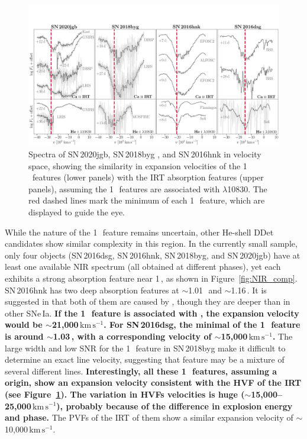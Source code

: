 \documentclass[twocolumn]{aastex631}
\newcommand{\sn}{SN\,2020jgb}
\newcommand{\kms}{$\mathrm{km}\,\mathrm{s}^{-1}$}
\newcommand{\revise}[1]{\textbf{#1}}
\begin{document}
\begin{figure}
    \centering
    \includegraphics[width=\textwidth]{CaII_HeI_hvf.pdf}
    \caption{Spectra of \sn, SN\,2018byg \citep{de_18byg_2019}, and SN\,2016hnk \citep{galbany_16hnk_2019} in velocity space, showing the similarity in expansion velocities of the 1\,\micron\ features (lower panels) with the  IRT absorption features (upper panels), assuming the 1\,\micron\ features are associated with  $\lambda$10830. The red dashed lines mark the minimum of each 1\,\micron\ feature, which are displayed to guide the eye.}
    \label{fig:hvf_comp}
\end{figure}

While the nature of the 1\,\micron\ feature remains uncertain, other He-shell DDet candidates show similar complexity in this region. In the currently small sample, only four objects (SN\,2016dsg, SN\,2016hnk, SN\,2018byg, and \sn) have at least one available NIR spectrum (all obtained at different phases), yet each exhibits a strong absorption feature near 1\,\micron, as shown in Figure~\ref{fig:NIR_comp}. SN\,2016hnk has two deep absorption features at $\sim$1.01\,\micron\ and $\sim$1.16\,\micron. It is suggested in \citet{galbany_16hnk_2019} that both of them are caused by , though they are deeper than in other SNe\,Ia. \revise{If the 1\,\micron\ feature is associated with \ion{He}{1}, the expansion velocity would be $\sim$21,000\,\kms. For SN\,2016dsg, the minimal of the 1\,\micron\ feature is around $\sim$1.03\,\micron, with a corresponding velocity of $\sim$15,000\,\kms.} The large width and low SNR for the 1\,\micron\ feature in SN\,2018byg make it difficult to determine an exact line velocity, suggesting that feature may be a mixture of several different lines. \revise{Interestingly, all these 1\,\micron\ features, assuming a \ion{He}{1} origin, show an expansion velocity consistent with the HVF of the \ion{Ca}{2} IRT (see Figure~\ref{fig:hvf_comp}). The variation in HVFs velocities is huge ($\sim$15,000--25,000\,\kms), probably because of the difference in explosion energy and phase.} The PVFs of the  IRT of them show a similar expansion velocity of $\sim$10,000\,\kms. 
\end{document}
